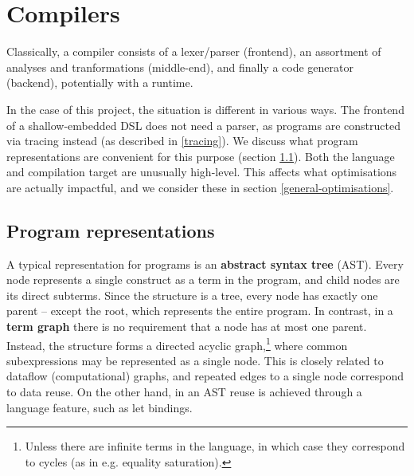 

\section{Compilers}
\label{compiler-techniques}

Classically, a compiler consists of a lexer/parser (frontend), an assortment of analyses and tranformations (middle-end), and finally a code generator (backend), potentially with a runtime. 

In the case of this project, the situation is different in various ways. The frontend of a shallow-embedded DSL does not need a parser, as programs are constructed via tracing instead (as described in \ref{tracing}). We discuss what program representations are convenient for this purpose (section \ref{representations}). Both the language and compilation target are unusually high-level. This affects what optimisations are actually impactful, and we consider these in section \ref{general-optimisations}.

\subsection{Program representations} \label{representations}

A typical representation for programs is an \textbf{abstract syntax tree} (AST). 
Every node represents a single construct as a term in the program, and child nodes are its direct subterms. 
Since the structure is a tree, every node has exactly one parent -- except the root, which represents the entire program. 
In contrast, in a \textbf{term graph} there is no requirement that a node has at most one parent. 
Instead, the structure forms a directed acyclic graph,\footnote{Unless there are infinite terms in the language, in which case they correspond to cycles (as in e.g. equality saturation).} where common subexpressions may be represented as a single node. 
This is closely related to dataflow (computational) graphs, and repeated edges to a single node correspond to data reuse. On the other hand, in an AST reuse is achieved through a language feature, such as let bindings.

